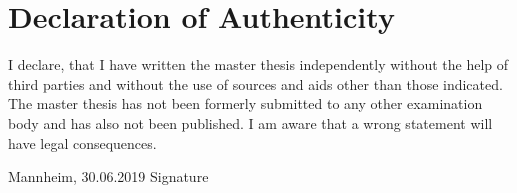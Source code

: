 \pagestyle{empty}

\section*{Declaration of Authenticity}
I declare, that I have written the master thesis independently without the help of third parties and without the use of sources and aids other than those indicated. The master thesis has not been formerly submitted to any other examination body and has also not been published. I am aware that a wrong statement will have legal consequences.


\noindent
Mannheim, 30.06.2019 \hspace{4cm} Signature